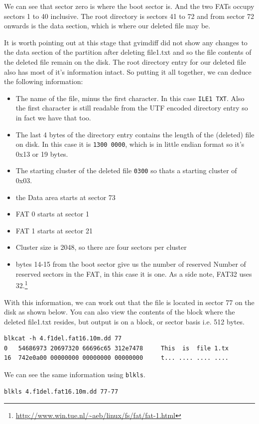 \documentclass[a4paper,
    11pt,
    normalheadings,
    parindent,
    UKenglish,
    abstracton,
    ]{scrartcl}
\begin{document}
We can see that sector zero is where the boot sector is. And the two FATs occupy sectors 1 to 40 inclusive.
The root directory is sectors 41 to 72 and from sector 72 onwards is the data section, which is where our deleted file may be.

It is worth pointing out at this stage that gvimdiff did not show any changes to the data section of the partition after deleting file1.txt and so the file contents of the deleted file remain on the disk. The root directory entry for our deleted file also has most of it's information intact. So putting it all together, we can deduce the following information:

\begin{itemize}
	\item The name of the file, minus the first character. In this case \texttt{ILE1 TXT}. Also the first character is still readable from the UTF encoded directory entry so in fact we have that too.
	\item The last 4 bytes of the directory entry contains the length of the (deleted) file on disk. In this case it is \texttt{1300 0000}, which is in little endian format so it's 0x13 or 19 bytes.
	\item The starting cluster of the deleted file \texttt{0300} so thats a starting cluster of 0x03.
	\item the Data area starts at sector 73
	\item FAT 0 starts at sector 1
	\item FAT 1 starts at sector 21
	\item Cluster size is 2048, so there are four sectors per cluster
	\item bytes 14-15 from the boot sector give us the number of reserved Number of reserved sectors in the FAT, in this case it is one. As a side note, FAT32 uses 32.\footnote{\url{http://www.win.tue.nl/~aeb/linux/fs/fat/fat-1.html}}

\end{itemize}

With this information, we can work out that the file is located in sector 77 on the disk as shown below.
You can also view the contents of the block where the deleted file1.txt resides, but output is on a block, or sector basis i.e. 512 bytes.
\begin{verbatim}
blkcat -h 4.f1del.fat16.10m.dd 77
0	54686973 20697320 66696c65 312e7478 	This  is  file 1.tx
16	742e0a00 00000000 00000000 00000000 	t... .... .... ....
\end{verbatim}
We can see the same information using \texttt{blkls}.
\begin{verbatim}
blkls 4.f1del.fat16.10m.dd 77-77
\end{verbatim}
\end{document}
